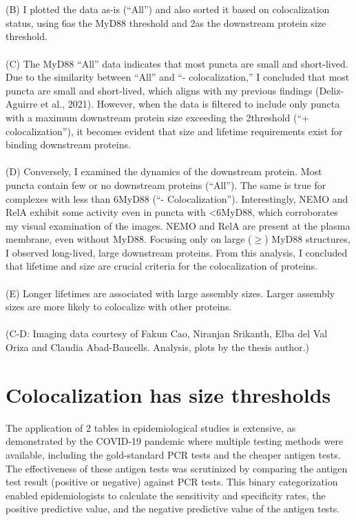 \begin{centering}
{\\
\\
(B) I plotted the data as-is (“All”) and also sorted it based on colocalization status, using 6\times as the MyD88 threshold and 2\times as the downstream protein size threshold.
\\
\\
(C) The MyD88 “All” data indicates that most puncta are small and short-lived. Due to the similarity between “All” and “- colocalization,” I concluded that most puncta are small and short-lived, which aligns with my previous findings (Deliz-Aguirre et al., 2021). However, when the data is filtered to include only puncta with a maximum downstream protein size exceeding the 2\times threshold (“+ colocalization”), it becomes evident that size and lifetime requirements exist for binding downstream proteins.
\\
\\
(D) Conversely, I examined the dynamics of the downstream protein. Most puncta contain few or no downstream proteins (“All”). The same is true for complexes with less than 6\times MyD88 (“- Colocalization”). Interestingly, NEMO and RelA exhibit some activity even in puncta with <6\times MyD88, which corroborates my visual examination of the images. NEMO and RelA are present at the plasma membrane, even without MyD88. Focusing only on large ($\geq$) MyD88 structures, I observed long-lived, large downstream proteins. From this analysis, I concluded that lifetime and size are crucial criteria for the colocalization of proteins.
\\
\\
(E) Longer lifetimes are associated with large assembly sizes. Larger assembly sizes are more likely to colocalize with other proteins.
\\
\\
(C-D: Imaging data courtesy of Fakun Cao, Niranjan Srikanth, Elba del Val Oriza and Claudia Abad-Baucells. Analysis, plots by the thesis author.)}
\label{p2:S1}
\end{centering}

\section{Colocalization has size thresholds}
\label{section:thresholds}
The application of 2 tables in epidemiological studies is extensive, as demonstrated by the COVID-19 pandemic where multiple testing methods were available, including the gold-standard PCR tests and the cheaper antigen tests. The effectiveness of these antigen tests was scrutinized by comparing the antigen test result (positive or negative) against PCR tests. This binary categorization enabled epidemiologists to calculate the sensitivity and specificity rates, the positive predictive value, and the negative predictive value of the antigen tests.

